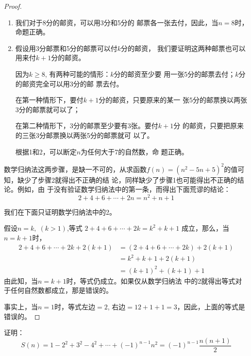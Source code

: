 \begin{proof}
\begin{enumerate}
    \item 我们对于8分的邮资，可以用3分和5分的
    邮票各一张去付，因此，当$n=8$时，命题正确。
    \item 假设用3分邮票和5分的邮票可以付$k$分的邮资，
    我们要证明这两种邮票也可以用来付$k+1$分的邮资。

    因为$k\ge 8$, 有两种可能的情形：$k$分的邮资至少要
    用一张5分的邮票去付；$k$分的邮资完全可以用3分的邮
    票去付。

    在第一种情形下，要付$k+1$分的邮资，只要原来的某一
    张5分的邮票换以两张3分的邮票就可以了；

    在第二种情形下，3分的邮票至少要有3张。要付$k+1$分
    的邮资，只要把原来的三张3分邮票换以两张5分的邮票就可
    以了。

    根据1和2，可以断定$n$为任何大于7的自然数，命
    题正确。
\end{enumerate}


数学归纳法这两步骤，是缺一不可的，从求函数$f(n)=
(n^2-5n+5)^2$的值可知，缺少了步骤2就得出不正确的结
论，同样缺少了步骤1也可能得出不正确的结论。例如，由
于没有验证数学归纳法中的第一条，而得出下面荒谬的结论：
\[2+4+6+\cdots+2n=n^2+n+1\]

我们在下面只证明数学归纳法中的2。

假设$n=k,\; (k>1)$,等式
$2+4+6+\cdots+2k=k^2+k+1$
成立，那么，当$n=k+1$时，
\begin{align*}
    2+4+6+\cdots+2k+2(k+1)&=(2+4+6+\cdots+2k)+2(k+1)\\
&=k^2+k+1+2(k+1)  \tag{数学归纳法假设}\\
&=(k+1)^2+(k+1)+1
\end{align*}
由此知，当$n=k+1$时，等式仍成立。如果仅从数学归纳法
中的2就得出等式对于任何自然数都成立，那是错误的。

事实上，当$n=1$时，等式左边$=2$, 右边$=12+1+1=
3$，因此，上面的等式是错误的。
\end{proof}

\begin{example}
    证明：
\[S(n)=1-2^2+3^2-4^2+\cdots+(-1)^{n-1}n^2=(-1)^{n-1}\frac{n(n+1)}{2}\]
\end{example}

